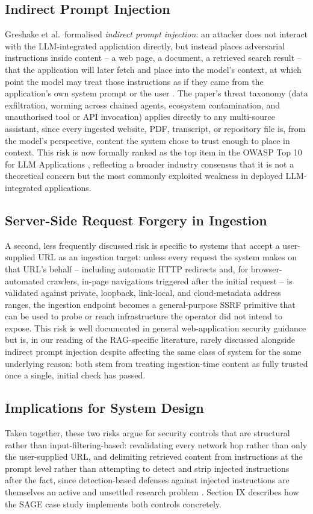\documentclass[conference]{IEEEtran}
\begin{document}
\subsection{Indirect Prompt Injection}
Greshake et al.\ formalised \emph{indirect prompt injection}: an attacker
does not interact with the LLM-integrated application directly, but
instead places adversarial instructions inside content -- a web page, a
document, a retrieved search result -- that the application will later
fetch and place into the model's context, at which point the model may
treat those instructions as if they came from the application's own
system prompt or the user \cite{greshake2023injection}. The paper's
threat taxonomy (data exfiltration, worming across chained agents,
ecosystem contamination, and unauthorised tool or API invocation) applies
directly to any multi-source assistant, since every ingested website,
PDF, transcript, or repository file is, from the model's perspective,
content the system chose to trust enough to place in context. This risk
is now formally ranked as the top item in the OWASP Top 10 for LLM
Applications \cite{owasp2025llm01}, reflecting a broader industry
consensus that it is not a theoretical concern but the most commonly
exploited weakness in deployed LLM-integrated applications.

\subsection{Server-Side Request Forgery in Ingestion}
A second, less frequently discussed risk is specific to systems that
accept a user-supplied URL as an ingestion target: unless every request
the system makes on that URL's behalf -- including automatic HTTP
redirects and, for browser-automated crawlers, in-page navigations
triggered after the initial request -- is validated against private,
loopback, link-local, and cloud-metadata address ranges, the ingestion
endpoint becomes a general-purpose SSRF primitive that can be used to
probe or reach infrastructure the operator did not intend to expose. This
risk is well documented in general web-application security guidance but
is, in our reading of the RAG-specific literature, rarely discussed
alongside indirect prompt injection despite affecting the same class of
system for the same underlying reason: both stem from treating
ingestion-time content as fully trusted once a single, initial check has
passed.

\subsection{Implications for System Design}
Taken together, these two risks argue for security controls that are
structural rather than input-filtering-based: revalidating every network
hop rather than only the user-supplied URL, and delimiting retrieved
content from instructions at the prompt level rather than attempting to
detect and strip injected instructions after the fact, since detection-based
defenses against injected instructions are themselves an active and
unsettled research problem \cite{greshake2023injection,owasp2025llm01}.
Section IX describes how the SAGE case study implements both controls
concretely.
\end{document}
